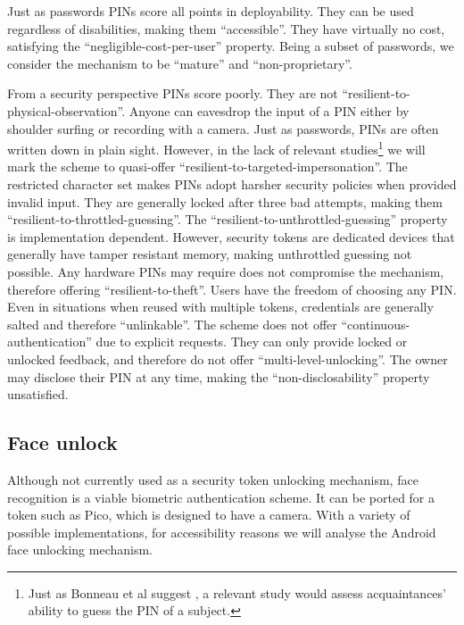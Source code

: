 Just as passwords PINs score all points in deployability. They can be used regardless of disabilities, making them ``accessible''. They have virtually no cost, satisfying the ``negligible-cost-per-user'' property. Being a subset of passwords, we consider the mechanism to be ``mature'' and ``non-proprietary''.
	
From a security perspective PINs score poorly. They are not ``resilient-to-physical-observation''. Anyone can eavesdrop the input of a PIN either by shoulder surfing or recording with a camera. Just as passwords, PINs are often written down in plain sight. However, in the lack of relevant studies\footnote{Just as Bonneau et al suggest \cite{bonneau2012quest}, a relevant study would assess acquaintances' ability to guess the PIN of a subject.} we will mark the scheme to quasi-offer ``resilient-to-targeted-impersonation''. The restricted character set makes PINs adopt harsher security policies when provided invalid input. They are generally locked after three bad attempts, making them ``resilient-to-throttled-guessing''. The ``resilient-to-unthrottled-guessing'' property is implementation dependent. However, security tokens are dedicated devices that generally have tamper resistant memory, making unthrottled guessing not possible. Any hardware PINs may require does not compromise the mechanism, therefore offering ``resilient-to-theft''. Users have the freedom of choosing any PIN. Even in situations when reused with multiple tokens, credentials are generally salted and therefore ``unlinkable''. The scheme does not offer ``continuous-authentication'' due to explicit requests. They can only provide locked or unlocked feedback, and therefore do not offer ``multi-level-unlocking''. The owner may disclose their PIN at any time, making the ``non-disclosability'' property unsatisfied. 
	
%
%
\subsection{Face unlock}
Although not currently used as a security token unlocking mechanism, face recognition is a viable biometric authentication scheme. It can be ported for a token such as Pico, which is designed to have a camera. With a variety of possible implementations, for accessibility reasons we will analyse the Android face unlocking mechanism.
	
